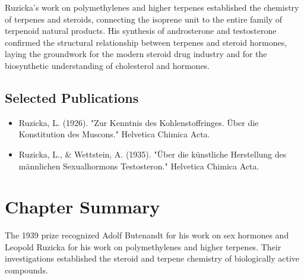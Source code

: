 Ruzicka's work on polymethylenes and higher terpenes established the chemistry of terpenes and steroids, connecting the isoprene unit to the entire family of terpenoid natural products. His synthesis of androsterone and testosterone confirmed the structural relationship between terpenes and steroid hormones, laying the groundwork for the modern steroid drug industry and for the biosynthetic understanding of cholesterol and hormones.

\subsection*{Selected Publications}

\begin{itemize}

\item Ruzicka, L. (1926). "Zur Kenntnis des Kohlenstoffringes. Über die Konstitution des Muscons." Helvetica Chimica Acta.

\item Ruzicka, L., \& Wettstein, A. (1935). "Über die künstliche Herstellung des männlichen Sexualhormons Testosteron." Helvetica Chimica Acta.

\end{itemize}

\clearpage

\section*{Chapter Summary}

The 1939 prize recognized Adolf Butenandt for his work on sex hormones and Leopold Ruzicka for his work on polymethylenes and higher terpenes. Their investigations established the steroid and terpene chemistry of biologically active compounds.
